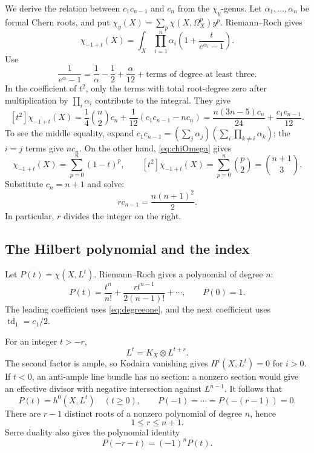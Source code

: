 \documentclass[11pt,reqno,letterpaper]{amsart}
\newcommand{\td}{\operatorname{td}}
\theoremstyle{definition}
\numberwithin{equation}{section}
\begin{document}
We derive the relation between $c_1c_{n-1}$ and $c_n$ from the $\chi_y$-genus.
Let $\alpha_1,\ldots,\alpha_n$ be formal Chern roots, and put
$\chi_y(X)=\sum_p\chi(X,\Omega_X^p)y^p$. Riemann--Roch gives
\[
 \chi_{-1+t}(X)=
 \int_X\prod_{i=1}^n
 \alpha_i\left(1+\frac{t}{e^{\alpha_i}-1}\right).
\]
Use
\[
 \frac1{e^\alpha-1}=\frac1\alpha-\frac12+\frac{\alpha}{12}
                  +\text{terms of degree at least three}.
\]
In the coefficient of $t^2$, only the terms with total root-degree zero
after multiplication by $\prod_i\alpha_i$ contribute to the integral.
They give
\[
 [t^2]\chi_{-1+t}(X)=
 \frac14\binom n2 c_n+
 \frac1{12}\left(c_1c_{n-1}-nc_n\right)
 =\frac{n(3n-5)c_n}{24}+\frac{c_1c_{n-1}}{12}.
\]
To see the middle equality, expand
$c_1c_{n-1}=(\sum_j\alpha_j)(\sum_i\prod_{k\ne i}\alpha_k)$;
the $i=j$ terms give $nc_n$.
On the other hand, \eqref{eq:chiOmega} gives
\[
 \chi_{-1+t}(X)=\sum_{p=0}^n(1-t)^p,\qquad
 [t^2]\chi_{-1+t}(X)=\sum_{p=0}^n\binom p2=\binom{n+1}{3}.
\]
Substitute $c_n=n+1$ and solve:
\begin{equation}\label{eq:rcn}
 r c_{n-1}=\frac{n(n+1)^2}{2}.
\end{equation}
In particular, $r$ divides the integer on the right.

\subsection{The Hilbert polynomial and the index}
Let $P(t)=\chi(X,L^t)$. Riemann--Roch gives a polynomial of degree $n$:
\begin{equation}\label{eq:P-leading}
 P(t)=\frac{t^n}{n!}+\frac{rt^{n-1}}{2(n-1)!}+\cdots,\qquad P(0)=1.
\end{equation}
The leading coefficient uses \eqref{eq:degreeone}, and the next coefficient
uses $\td_1=c_1/2$.

For an integer $t>-r$,
\[
 L^t=K_X\otimes L^{t+r}.
\]
The second factor is ample, so Kodaira vanishing gives
$H^i(X,L^t)=0$ for $i>0$. If $t<0$, an anti-ample line bundle has no section:
a nonzero section would give an effective divisor with negative intersection
against $L^{n-1}$. It follows that
\begin{equation}\label{eq:kodaira}
 P(t)=h^0(X,L^t)\quad(t\ge0),\qquad
 P(-1)=\cdots=P(-(r-1))=0.
\end{equation}
There are $r-1$ distinct roots of a nonzero polynomial of degree $n$, hence
\begin{equation}\label{eq:rbound}
 1\le r\le n+1.
\end{equation}
Serre duality also gives the polynomial identity
\begin{equation}\label{eq:SerreP}
 P(-r-t)=(-1)^nP(t).
\end{equation}
\end{document}
